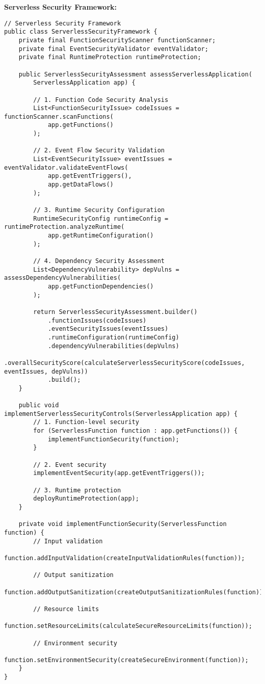 \textbf{Serverless Security Framework:}
\begin{lstlisting}[breaklines=true,basicstyle=\ttfamily\footnotesize]
// Serverless Security Framework
public class ServerlessSecurityFramework {
    private final FunctionSecurityScanner functionScanner;
    private final EventSecurityValidator eventValidator;
    private final RuntimeProtection runtimeProtection;
    
    public ServerlessSecurityAssessment assessServerlessApplication(
        ServerlessApplication app) {
        
        // 1. Function Code Security Analysis
        List<FunctionSecurityIssue> codeIssues = functionScanner.scanFunctions(
            app.getFunctions()
        );
        
        // 2. Event Flow Security Validation
        List<EventSecurityIssue> eventIssues = eventValidator.validateEventFlows(
            app.getEventTriggers(),
            app.getDataFlows()
        );
        
        // 3. Runtime Security Configuration
        RuntimeSecurityConfig runtimeConfig = runtimeProtection.analyzeRuntime(
            app.getRuntimeConfiguration()
        );
        
        // 4. Dependency Security Assessment
        List<DependencyVulnerability> depVulns = assessDependencyVulnerabilities(
            app.getFunctionDependencies()
        );
        
        return ServerlessSecurityAssessment.builder()
            .functionIssues(codeIssues)
            .eventSecurityIssues(eventIssues)
            .runtimeConfiguration(runtimeConfig)
            .dependencyVulnerabilities(depVulns)
            .overallSecurityScore(calculateServerlessSecurityScore(codeIssues, eventIssues, depVulns))
            .build();
    }
    
    public void implementServerlessSecurityControls(ServerlessApplication app) {
        // 1. Function-level security
        for (ServerlessFunction function : app.getFunctions()) {
            implementFunctionSecurity(function);
        }
        
        // 2. Event security
        implementEventSecurity(app.getEventTriggers());
        
        // 3. Runtime protection
        deployRuntimeProtection(app);
    }
    
    private void implementFunctionSecurity(ServerlessFunction function) {
        // Input validation
        function.addInputValidation(createInputValidationRules(function));
        
        // Output sanitization
        function.addOutputSanitization(createOutputSanitizationRules(function));
        
        // Resource limits
        function.setResourceLimits(calculateSecureResourceLimits(function));
        
        // Environment security
        function.setEnvironmentSecurity(createSecureEnvironment(function));
    }
}
\end{lstlisting}

